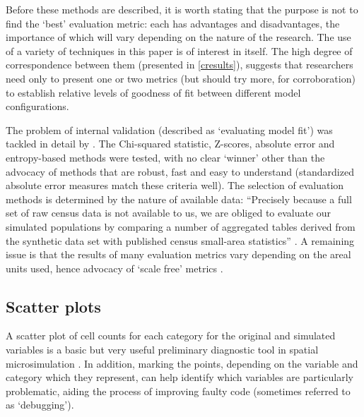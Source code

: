 \documentclass[a4paper,10pt]{article}
\begin{document}
Before these methods are described, it is
worth stating that the purpose is not to find the `best' evaluation metric:
each has advantages and disadvantages, the importance of which will vary depending on the
nature of the research. The use of a variety of techniques in this paper
is of interest in itself. The high degree of correspondence between them (presented in \cref{cresults}),
suggests that researchers need only to present one or two metrics (but should
try more, for corroboration)
to establish relative levels of goodness of fit between
different model configurations.

The problem of internal validation
(described as `evaluating model fit') was tackled in detail by \citet{Voas2001}.
The Chi-squared statistic, Z-scores, absolute error and entropy-based methods
were tested, with no clear `winner' other than the advocacy of
methods that are robust, fast and easy to understand (standardized absolute
error measures match these criteria well).
The selection of evaluation methods is determined by
the nature of available data:
``Precisely because a full set of raw census data is not
available to us, we are obliged to evaluate our simulated populations by comparing
a number of aggregated tables derived from the synthetic data set with published
census small-area statistics'' \citep[p.~178]{Voas2001}.
A remaining issue is that the results of many evaluation metrics vary depending
on the areal units used, hence advocacy of `scale free' metrics \citep{Malleson2012}	.

%


\subsection{Scatter plots}
A scatter plot of cell counts for each category for the original and simulated variables is
a basic but very useful preliminary diagnostic tool in spatial microsimulation
\citep{Ballas2005c,Edwards2009}.
In addition, marking the points, depending on the
variable and category %
which they represent, can help identify which variables are particularly problematic,
aiding the process of improving faulty code (sometimes referred to as `debugging').
\end{document}
